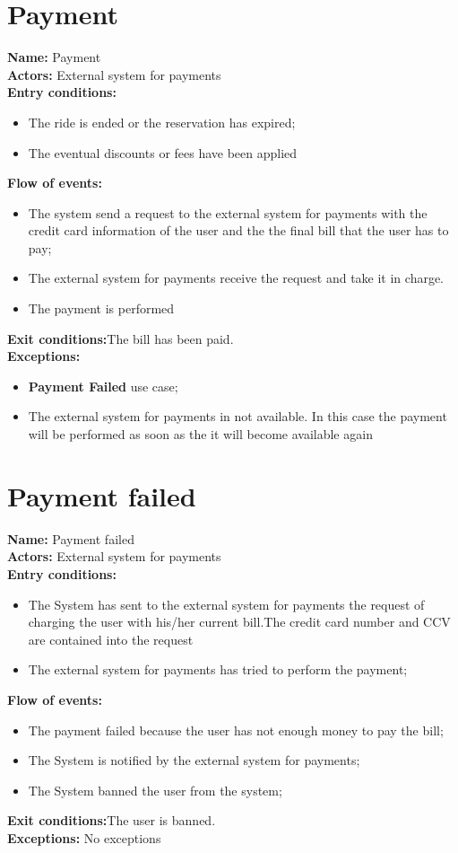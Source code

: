 \section*{Payment}
\textbf{Name:} Payment\\
\textbf{Actors:} External system for payments\\
\textbf{Entry conditions:}
\begin{itemize}
\item The ride is ended or the reservation has expired;
\item The eventual discounts or fees have been applied
\end{itemize}
\textbf{Flow of events:}
\begin{itemize}
\item The system send a request to the external system for payments with the credit card information of the user and the the final bill that the user has to pay;
\item The external system for payments receive the request and take it in charge.
\item The payment is performed
\end{itemize}
\textbf{Exit conditions:}The bill has been paid.\\
\textbf{Exceptions:}
\begin{itemize}
\item\textbf{Payment Failed} use case;
\item The external system for payments in not available. In this case the payment will be performed as soon as the it will become available again
\end{itemize}

\section*{Payment failed}
\textbf{Name:} Payment failed\\
\textbf{Actors:} External system for payments\\
\textbf{Entry conditions:}
\begin{itemize}
\item The System has sent to the external system for payments the request of charging the user with his/her current bill.The credit card number and CCV are contained into the request
\item The external system for payments has tried to perform the payment;
\end{itemize}
\textbf{Flow of events:}
\begin{itemize}
\item The payment failed because the user has not enough money to pay the bill;
\item The System is notified by the external system for payments;
\item The System banned the user from the system;
\end{itemize}
\textbf{Exit conditions:}The user is banned.\\
\textbf{Exceptions:} No exceptions \\


